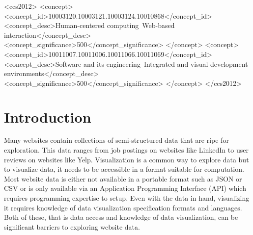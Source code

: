 \documentclass[sigconf,screen]{acmart}
\begin{document}
\begin{CCSXML}
<ccs2012>
   <concept>
       <concept_id>10003120.10003121.10003124.10010868</concept_id>
       <concept_desc>Human-centered computing~Web-based interaction</concept_desc>
       <concept_significance>500</concept_significance>
       </concept>
   <concept>
       <concept_id>10011007.10011006.10011066.10011069</concept_id>
       <concept_desc>Software and its engineering~Integrated and visual development environments</concept_desc>
       <concept_significance>500</concept_significance>
       </concept>
 </ccs2012>
\end{CCSXML}




\maketitle

\hypertarget{sec:introduction}{%
\section{Introduction}\label{sec:introduction}}

Many websites contain collections of semi-structured data that are ripe
for exploration. This data ranges from job postings on websites like
LinkedIn to user reviews on websites like Yelp. Visualization is a
common way to explore data but to visualize data, it needs to be
accessible in a format suitable for computation. Most website data is
either not available in a portable format such as JSON or CSV or is only
available via an Application Programming Interface (API) which requires
programming expertise to setup. Even with the data in hand, visualizing
it requires knowledge of data visualization specification formats and
languages. Both of these, that is data access and knowledge of data
visualization, can be significant barriers to exploring website data.
\end{document}
